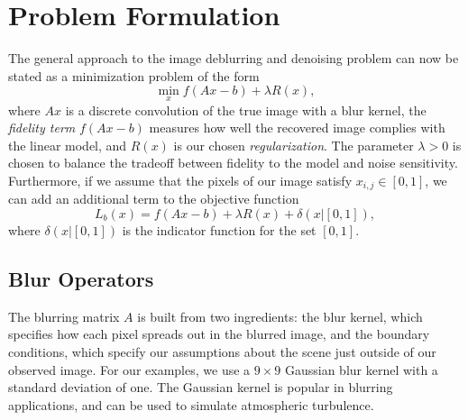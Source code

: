 \documentclass[10pt,a4paper]{article}
\begin{document}
\section{Problem Formulation}
The general approach to the image deblurring and denoising problem can now be stated as a minimization problem of the form \cite{DeblurBook}
\begin{equation} \label{general}
 \min_x f(Ax -b) + \lambda R(x),
\end{equation}
where $Ax$ is a discrete convolution of the true image with a blur kernel, the  \emph{fidelity term} $f(Ax-b)$ measures how well the recovered image complies with the linear model, and $R(x)$ is our chosen \emph{regularization}. The parameter $\lambda > 0$ is chosen to balance the tradeoff between fidelity to the model and noise sensitivity. Furthermore, if we assume that the pixels of our image satisfy $x_{i,j} \in [0,1]$, we can add an additional term to the objective function
\begin{equation} \label{loss}
 L_b(x) = f(Ax-b) + \lambda R(x) + \delta(x | [0,1] ),
\end{equation}
where $\delta(x | [0,1])$ is the indicator function for the set $[0,1]$. 

\subsection{Blur Operators}
The blurring matrix $A$ is built from two ingredients: the blur kernel, which specifies how each pixel spreads out in the blurred image, and the boundary conditions, which specify our assumptions about the scene just outside of our observed image. For our examples, we use a $9 \times 9$ Gaussian blur kernel with a standard deviation of one. The Gaussian kernel is popular in blurring applications, and can be used to simulate atmospheric turbulence. 
\end{document}
